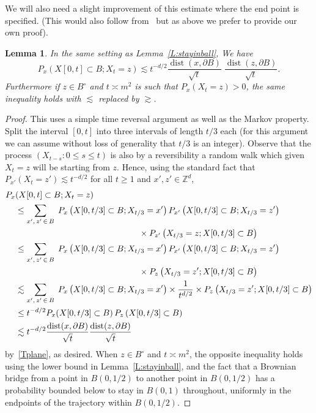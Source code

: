 \documentclass[10pt]{amsart}
\newtheorem{lemm}[theo]{Lemma}\newtheorem{prop}[theo]{Proposition}\newtheorem{coro}[theo]{Corollary}\newtheorem{conj}[theo]{Conjecture}
\theoremstyle{definition}\newtheorem{defi}[theo]{Definition}\newtheorem{rema}[theo]{Remark}\newtheorem{exam}[theo]{Example}\newtheorem{exem}[theo]{Example}\newtheorem{nota}[theo]{Notation}
\DeclareMathOperator{\dist}{dist}
\newcommand{\Pmh}{P}
\begin{document}
We will also need a slight improvement of this estimate where the end point is specified. (This would also follow from~\cite[Proposition~6.9.4.]{LL} but as above we prefer to provide our own proof).

\begin{lemm}\label{L:stayinball_bridge}
In the same setting as Lemma~\ref{L:stayinball},
We have
\[
\Pmh_x (X[0, t] \subset B; X_t = z) \lesssim t^{ - d/2} \frac{\dist(x, \partial B)}{\sqrt{t}}\;\frac{\dist(z, \partial B)}{\sqrt{t}}.
\]
Furthermore if $z \in B^\circ$ and $t \asymp m^2$ is such that $\Pmh_x(X_t = z)>0$, the same inequality holds with $\lesssim$ replaced by $\gtrsim$.
\end{lemm}

\begin{proof}
This uses a simple time reversal argument as well as the Markov property. Split the interval $[0,t]$ into three intervals of length $t /3$ each (for this argument we can assume without loss of generality that $t/3$ is an integer). Observe that the process $(X_{t-s} : 0 \le s \le t)$ is also by a reversibility a random walk which given $X_t =z$ will be starting from $z$. Hence, using the standard fact that $\Pmh_{x'}(X_t = z') \lesssim t^{-d/2}$ for all $t \ge 1$ and $x', z' \in \mathbb{Z}^d$,
\begin{align*}
\Pmh_x & (X[0, t] \subset B; X_t = z) \\
& \le \sum_{x',\,z'\,\in\,B}\;\Pmh_x\left(X[0, t/3] \subset B; X_{t/3} = x'\right) \Pmh_{x'} \left(X[0, t /3] \subset B; X_{t/3} = z'\right) \\
& \mkern260mu \times \Pmh_{z'} \left(X_{t/3} = z; X[0, t/3] \subset B\right)\\
& \le \sum_{x',\,z'\,\in\,B}\;\Pmh_x\left(X[0, t/3] \subset B; X_{t/3} = x'\right) \Pmh_{x'} \left(X[0, t /3] \subset B; X_{t/3} = z'\right) \\
& \mkern260mu \times \Pmh_{z} \left(X_{t/3} = z'; X[0, t/3] \subset B\right)\\
& \lesssim \sum_{x',\,z'\,\in\,B}\;\Pmh_x\left(X[0, t/3] \subset B; X_{t/3} = x'\right) \times \frac1{t^{d/2}} \times \Pmh_{z} \left(X_{t/3} = z'; X[0, t/3] \subset B\right)\\
& \le t^{ - d/2} \Pmh_x (X[0, t/3] \subset B) \,\Pmh_z\,(X[0, t / 3] \subset B)\\
& \lesssim t^{ - d/2} \frac{\dist(x, \partial B)}{\sqrt{t}} \frac{\dist(z, \partial B)}{\sqrt{t}}
\end{align*}
by~\eqref{Tplane}, as desired. When $z \in B^\circ$ and $t \asymp m^2$, the opposite inequality holds using the lower bound in Lemma~\ref{L:stayinball}, and the fact that a Brownian bridge from a point in $B(0,1/2)$ to another point in $B(0,1/2)$ has a probability bounded below to stay in $B(0,1)$ throughout, uniformly in the endpoints of the trajectory within $B(0,1/2)$.
\end{proof}
\end{document}
